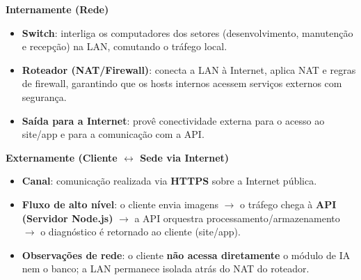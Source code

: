\noindent\textbf{Internamente (Rede)}
\begin{itemize}
    \setlength{\itemsep}{0.8em}   %
    \setlength{\topsep}{0.4em}    %
    \setlength{\parsep}{0pt}      %
    \setlength{\parskip}{0pt}
    \item \textbf{Switch}: interliga os computadores dos setores (desenvolvimento, manutenção e recepção) na LAN, comutando o tráfego local.
    \item \textbf{Roteador (NAT/Firewall)}: conecta a LAN à Internet, aplica NAT e regras de firewall, garantindo que os hosts internos acessem serviços externos com segurança.
    \item \textbf{Saída para a Internet}: provê conectividade externa para o acesso ao site/app e para a comunicação com a API.
\end{itemize}

\medskip
\noindent\textbf{Externamente (Cliente \(\leftrightarrow\) Sede via Internet)}
\begin{itemize}
    \setlength{\itemsep}{0.8em}
    \setlength{\topsep}{0.4em}
    \setlength{\parsep}{0pt}
    \setlength{\parskip}{0pt}
    \item \textbf{Canal}: comunicação realizada via \textbf{HTTPS} sobre a Internet pública.
    \item \textbf{Fluxo de alto nível}: o cliente envia imagens \(\rightarrow\) o tráfego chega à \textbf{API (Servidor Node.js)} \(\rightarrow\) a API orquestra processamento/armazenamento \(\rightarrow\) o diagnóstico é retornado ao cliente (site/app).
    \item \textbf{Observações de rede}: o cliente \textbf{não acessa diretamente} o módulo de IA nem o banco; a LAN permanece isolada atrás do NAT do roteador.
\end{itemize}
\medskip